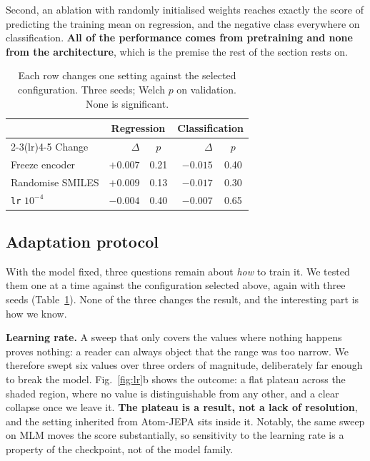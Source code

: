 \documentclass[10pt,twocolumn,a4paper]{article}
\begin{document}
Second, an ablation with randomly initialised weights reaches exactly
the score of predicting the training mean on regression, and the
negative class everywhere on classification. \textbf{All of the
performance comes from pretraining and none from the architecture},
which is the premise the rest of the section rests on.

\FloatBarrier

\begin{table}[t]
  \centering
  \caption{Each row changes one setting against the selected
  configuration. Three seeds; Welch $p$ on validation.
  None is significant.}
  \label{tab:robust}
  \small
  \begin{tabular}{lrcrc}
    \toprule
    & \multicolumn{2}{c}{Regression} & \multicolumn{2}{c}{Classification} \\
    \cmidrule(lr){2-3}\cmidrule(lr){4-5}
    Change & $\Delta$ & $p$ & $\Delta$ & $p$ \\
    \midrule
    Freeze encoder      & $+0.007$ & 0.21 & $-0.015$ & 0.40 \\
    Randomise SMILES    & $+0.009$ & 0.13 & $-0.017$ & 0.30 \\
    \texttt{lr} $10^{-4}$ & $-0.004$ & 0.40 & $-0.007$ & 0.65 \\
    \bottomrule
  \end{tabular}
\end{table}

\subsection{Adaptation protocol}

With the model fixed, three questions remain about \emph{how} to train
it. We tested them one at a time against the configuration selected above,
again with three seeds (Table~\ref{tab:robust}). None of the three
changes the result, and the interesting part is how we know.

\textbf{Learning rate.} A sweep that only covers the values where
nothing happens proves nothing: a reader can always object that the
range was too narrow. We therefore swept six values over three orders
of magnitude, deliberately far enough to break the model.
Fig.~\ref{fig:lr}b shows the outcome: a flat plateau across the shaded
region, where no value is distinguishable from any other, and a clear
collapse once we leave it. \textbf{The plateau is a result, not a lack
of resolution}, and the setting inherited from Atom-JEPA sits inside
it. Notably, the same sweep on MLM moves the score substantially, so
sensitivity to the learning rate is a property of the checkpoint, not
of the model family.
\end{document}
